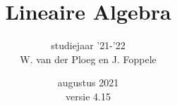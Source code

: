 \documentclass[hidelinks, a4wide, 12pt,  twoside]{book}
\begin{document}
	\title{Lineaire Algebra\\
    }
	\author{studiejaar '21-'22\\W. van der Ploeg en J. Foppele}
	\date{augustus 2021 \\ \normalsize versie 4.15}
	\maketitle
   \thispagestyle{empty}

\newcommand{\mydef}[3] []{
#1\index[definities]{#2}     \\
	\marginnote{\textbf{\Large $ \Delta $}  
		#2}[0cm] \quad #3   \\ \\}
\newcommand{\figuur}[3][0.4]{	
\begin{figure}[h]
		\centering
		\texttt{[image: figuren/\#2]}
		\caption{#3}
		\label{fig:#2}
		\index[figuren]{#3}
\end{figure}
\FloatBarrier	}
\newcommand{\mycent}[1]{\begin{center} #1\end{center}}
\newcommand{\mybv} [2][]{
\index [voorbeelden]{#1}
\marginnote{ {\LARGE $\nu$} #1}[0cm]
#2\\ 
}
\newcommand{\myeig} [2][]{ 
\index [eigenschappen]{#1}
\marginnote{ \textit{{\LARGE $\epsilon$}} #1}[0cm]
#2\\
}
\newcommand{\mytrans}[1]{$ #1^T $}
\newcommand{\noteq}{ $ \ne $ }
\newcommand{\RD}{${\rm I\!R^{3}} \ $}
\newcommand{\RT}{${\rm I\!R^{2}} \ $}
\newcommand{\red}[1]{
{\color{red}#1}}
\newcommand{\blu}[1]{
{\color{blue}#1}}
\newcommand{\gre}[1]{
{\color{green}#1}}
\newcommand{\pur}[1]{
{\color{purple}#1}}
\newcommand{\bro}[1]{
{\color{brown}#1}}
\newcommand{\dettwee}[2]{
\begin{vmatrix}
	#1 \\
	#2
\end{vmatrix}
}
\newcommand{\detvier}[4]{
\begin{vmatrix}
	#1 \\
	#2 \\
	#3 \\
	#4
\end{vmatrix}
}
\newcommand{\detdrie}[3]{
\begin{vmatrix}
	#1 \\
	#2 \\
	#3 
\end{vmatrix}
}
\newcommand{\mydet}[1]{ $ | #1 |$ }
\newcommand{\vecvijf}[5] {
$$
\begin{pmatrix} 
#1  \\ 
#2  \\ 
#3 \\
#4 \\
#5
\end{pmatrix}       $$}
\end{document}
